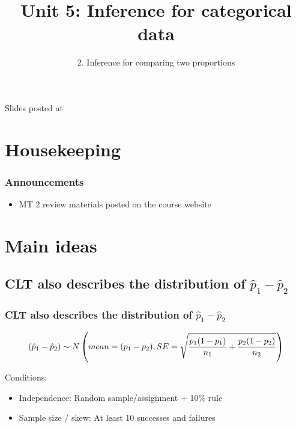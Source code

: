 \documentclass[slidestop,compress,mathserif,12pt,t,professionalfonts,xcolor=table]{beamer}
\title{Unit 5: Inference for categorical data}
\subtitle{2. Inference for comparing two proportions}
\author{\CourseName}
\date{}
\institute{\InstituteName}
\begin{document}



\begin{frame}[plain]

\titlepage

\vfill

{\scriptsize {} \hfill Slides posted at  \webURL{\CourseSite}}

\addtocounter{framenumber}{-1} 

\end{frame}


\section{Housekeeping}


\begin{frame}
\frametitle{Announcements}

\begin{itemize}

\item MT 2 review materials posted on the course website 

\end{itemize}

\end{frame}


\section{Main ideas}


\subsection{CLT also describes the distribution of $\hat{p}_1 - \hat{p}_2$}
\label{mi1}


\begin{frame}
\frametitle{CLT also describes the distribution of $\hat{p}_1 - \hat{p}_2$}

\[ (\hat{p}_1 - \hat{p}_2) \sim N \left(  mean = (p_1 - p_2), SE = \sqrt{ \frac{p_1(1-p_1)}{n_1} + \frac{p_2(1-p_2)}{n_2} }  \right) \]

Conditions:
\begin{itemize}
\item Independence: Random sample/assignment + 10\% rule
\item Sample size / skew: At least 10 successes and failures
\end{itemize}

\end{frame}
\end{document}
